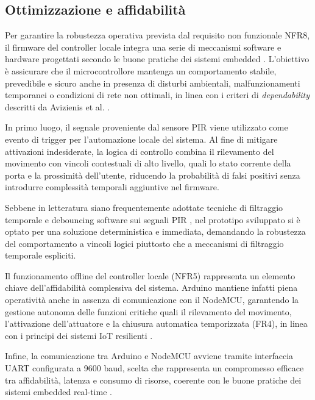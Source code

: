 \subsection*{Ottimizzazione e affidabilità}
Per garantire la robustezza operativa prevista dal requisito non funzionale NFR8, il firmware del controller locale integra una serie di meccanismi software e hardware progettati secondo le buone pratiche dei sistemi embedded \cite{Marwedel2021}. L'obiettivo è assicurare che il microcontrollore mantenga un comportamento stabile, prevedibile e sicuro anche in presenza di disturbi ambientali, malfunzionamenti temporanei o condizioni di rete non ottimali, in linea con i criteri di \textit{dependability} descritti da Avizienis et al. \cite{Avizienis2004}.

In primo luogo, il segnale proveniente dal sensore PIR viene utilizzato come evento
di trigger per l’automazione locale del sistema. Al fine di mitigare attivazioni
indesiderate, la logica di controllo combina il rilevamento del movimento con
vincoli contestuali di alto livello, quali lo stato corrente della porta e la
prossimità dell’utente, riducendo la probabilità di falsi positivi senza introdurre
complessità temporali aggiuntive nel firmware.

Sebbene in letteratura siano frequentemente adottate tecniche di filtraggio
temporale e debouncing software sui segnali PIR \cite{Gubbi2013,Marwedel2021},
nel prototipo sviluppato si è optato per una soluzione deterministica e immediata,
demandando la robustezza del comportamento a vincoli logici piuttosto che a
meccanismi di filtraggio temporale espliciti.

Il funzionamento offline del controller locale (NFR5) rappresenta un elemento
chiave dell’affidabilità complessiva del sistema. Arduino mantiene infatti piena
operatività anche in assenza di comunicazione con il NodeMCU, garantendo la
gestione autonoma delle funzioni critiche quali il rilevamento del movimento,
l’attivazione dell’attuatore e la chiusura automatica temporizzata (FR4), in linea
con i principi dei sistemi IoT resilienti \cite{Tang2022}.

Infine, la comunicazione tra Arduino e NodeMCU avviene tramite interfaccia UART
configurata a 9600 baud, scelta che rappresenta un compromesso efficace tra
affidabilità, latenza e consumo di risorse, coerente con le buone pratiche dei
sistemi embedded real-time \cite{Marwedel2021}.

